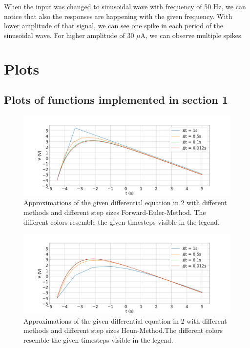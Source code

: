 \documentclass{scrartcl}			%
\begin{document}
When the input was changed to sinusoidal wave with frequency of 50 Hz, we can notice that also the responses are happening with the given frequency. With lower amplitude of that signal, we can see one spike in each period of the sinusoidal wave. For higher amplitude of 30 $\mu$A, we can observe multiple spikes.

\section{Plots}
\subsection{Plots of functions implemented in section 1}
\begin{figure}[hbpt!]					%
	\begin{flushleft}
		\hspace*{-0.7in}
		\includegraphics[scale=0.4]{1_1.png}
		\captionsetup{width=\linewidth}  %
		\caption{Approximations of the given differential equation in 2 with different methods and different step sizes Forward-Euler-Method. The different colors resemble the given timesteps visible in the legend.}
		\label{subsec_fig1_1} %
	\end{flushleft}
\end{figure}
\hspace*{0in}

\newpage
\begin{figure}[hbpt!]					%
	 \begin{flushleft}
		\hspace*{-0.7in}
		\includegraphics[scale=0.4]{1_2.png}
		\captionsetup{width=\linewidth}  %
		\caption{Approximations of the given differential equation in 2 with different methods and different step sizes Heun-Method.The different colors resemble the given timesteps visible in the legend.}
		\label{subsec_fig1_2} %
	\end{flushleft}
\end{figure}
\end{document}
